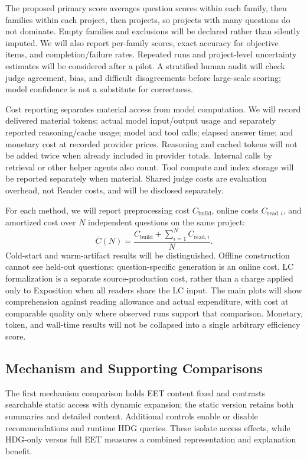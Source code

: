 \documentclass{article}
\begin{document}
The proposed primary score averages question scores within each family, then families within each project, then projects, so projects with many questions do not dominate. Empty families and exclusions will be declared rather than silently imputed. We will also report per-family scores, exact accuracy for objective items, and completion/failure rates. Repeated runs and project-level uncertainty estimates will be considered after a pilot. A stratified human audit will check judge agreement, bias, and difficult disagreements before large-scale scoring; model confidence is not a substitute for correctness.

Cost reporting separates material access from model computation. We will record delivered material tokens; actual model input/output usage and separately reported reasoning/cache usage; model and tool calls; elapsed answer time; and monetary cost at recorded provider prices. Reasoning and cached tokens will not be added twice when already included in provider totals. Internal calls by retrieval or other helper agents also count. Tool compute and index storage will be reported separately when material. Shared judge costs are evaluation overhead, not Reader costs, and will be disclosed separately.

For each method, we will report preprocessing cost $C_{\mathrm{build}}$, online costs $C_{\mathrm{read},i}$, and amortized cost over $N$ independent questions on the same project:
\[
\overline{C}(N)=\frac{C_{\mathrm{build}}+\sum_{i=1}^{N}C_{\mathrm{read},i}}{N}.
\]
Cold-start and warm-artifact results will be distinguished. Offline construction cannot see held-out questions; question-specific generation is an online cost. LC formalization is a separate source-production cost, rather than a charge applied only to Exposition when all readers share the LC input. The main plots will show comprehension against reading allowance and actual expenditure, with cost at comparable quality only where observed runs support that comparison. Monetary, token, and wall-time results will not be collapsed into a single arbitrary efficiency score.

\subsection{Mechanism and Supporting Comparisons}
The first mechanism comparison holds EET content fixed and contrasts searchable static access with dynamic expansion; the static version retains both summaries and detailed content. Additional controls enable or disable recommendations and runtime HDG queries. These isolate access effects, while HDG-only versus full EET measures a combined representation and explanation benefit.
\end{document}
